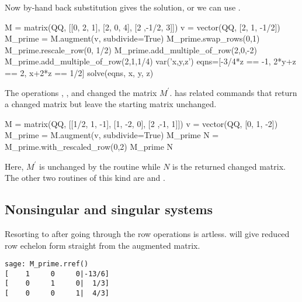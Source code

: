 Now by-hand back substitution gives the solution, or we can 
use .
\begin{sageoutput}[d,0,7]
M = matrix(QQ, [[0, 2, 1], [2, 0, 4], [2 ,-1/2, 3]])
v = vector(QQ, [2, 1, -1/2])                        
M_prime = M.augment(v, subdivide=True)              
M_prime.swap_rows(0,1)
M_prime.rescale_row(0, 1/2)
M_prime.add_multiple_of_row(2,0,-2)
M_prime.add_multiple_of_row(2,1,1/4)
var('x,y,z')
eqns=[-3/4*z == -1, 2*y+z == 2, x+2*z == 1/2]
solve(eqns, x, y, z)
\end{sageoutput}

The operations ,
, and 
changed the matrix $M^\prime$.
\Sage{} has related commands that return a changed matrix
but leave the starting matrix unchanged.
\begin{sageoutput}
M = matrix(QQ, [[1/2, 1, -1], [1, -2, 0], [2 ,-1, 1]])
v = vector(QQ, [0, 1, -2])
M_prime = M.augment(v, subdivide=True) 
M_prime
N = M_prime.with_rescaled_row(0,2)
M_prime
N      
\end{sageoutput}
\noindent
Here, $M^\prime$ is unchanged by the routine while $N$ is the returned 
changed matrix.
The other two routines of this kind are  
and .




\subsection{Nonsingular and singular systems}
Resorting to  after going through the row operations is artless.
\Sage{} will give reduced row echelon form straight from the augmented matrix.
\begin{lstlisting}
sage: M_prime.rref()
[    1     0     0|-13/6]
[    0     1     0|  1/3]
[    0     0     1|  4/3]
\end{lstlisting}

